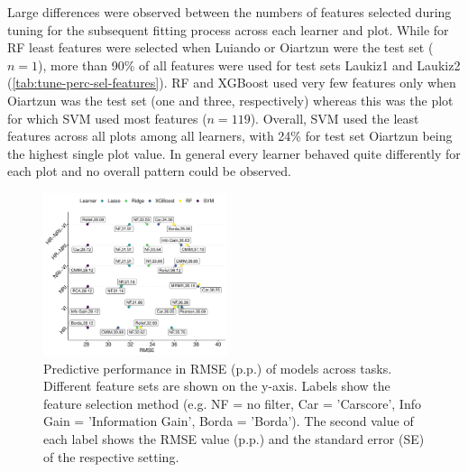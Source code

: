 \documentclass[final]{IEEEtran}
\begin{document}
Large differences were observed between the numbers of features selected during tuning for the subsequent fitting process across each learner and plot.
While for RF least features were selected when Luiando or Oiartzun were the test set ($n = 1$), more than 90\% of all features were used for test sets Laukiz1 and Laukiz2 (\autoref{tab:tune-perc-sel-features}).
RF and XGBoost used very few features only when Oiartzun was the test set (one and three, respectively) whereas this was the plot for which SVM used most features ($n = 119$).
Overall, SVM used the least features across all plots among all learners, with 24\% for test set Oiartzun being the highest single plot value.
In general every learner behaved quite differently for each plot and no overall pattern could be observed.











\begin{figure} [t!]
	\centering
	\begin{center}
		\includegraphics[width=0.48\textwidth] {performance-results-1.pdf}
		\caption{Predictive performance in RMSE (p.p.) of models across tasks. Different feature sets are shown on the y-axis. Labels show the feature selection method (e.g. NF = no filter, Car = 'Carscore', Info Gain = 'Information Gain', Borda = 'Borda'). The second value of each label shows the RMSE value (p.p.) and the standard error (SE) of the respective setting.}\label{fig:perf-result}
	\end{center}
\end{figure}
\end{document}
